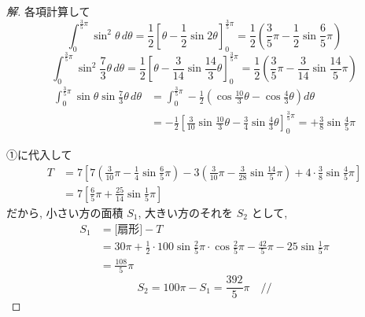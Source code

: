 \documentclass[../main.tex]{subfiles}
\begin{document}
\begin{proof}[解]
  各項計算して
  \[
    \int_0^{\frac{3}{5}\pi} \sin^2\theta \, d\theta = \frac{1}{2} \left[ \theta - \frac{1}{2}\sin 2\theta \right]_0^{\frac{3}{5}\pi} = \frac{1}{2} \left( \frac{3}{5}\pi - \frac{1}{2}\sin\frac{6}{5}\pi \right)
  \]
  \[
    \int_0^{\frac{3}{5}\pi} \sin^2\frac{7}{3}\theta \, d\theta = \frac{1}{2} \left[ \theta - \frac{3}{14}\sin\frac{14}{3}\theta \right]_0^{\frac{3}{5}\pi} = \frac{1}{2} \left( \frac{3}{5}\pi - \frac{3}{14}\sin\frac{14}{5}\pi \right)
  \]
  \begin{align*}
    \int_0^{\frac{3}{5}\pi} \sin\theta\sin\frac{7}{3}\theta \, d\theta &= \int_0^{\frac{3}{5}\pi} -\frac{1}{2} \left( \cos\frac{10}{3}\theta - \cos\frac{4}{3}\theta \right) d\theta \\
    &= -\frac{1}{2} \left[ \frac{3}{10}\sin\frac{10}{3}\theta - \frac{3}{4}\sin\frac{4}{3}\theta \right]_0^{\frac{3}{5}\pi} = +\frac{3}{8}\sin\frac{4}{5}\pi
  \end{align*}

  ①に代入して
  \begin{align*}
    T &= 7 \left[ 7 \left( \frac{3}{10}\pi - \frac{1}{4}\sin\frac{6}{5}\pi \right) - 3 \left( \frac{3}{10}\pi - \frac{3}{28}\sin\frac{14}{5}\pi \right) + 4 \cdot \frac{3}{8}\sin\frac{4}{5}\pi \right] \\
    &= 7 \left[ \frac{6}{5}\pi + \frac{25}{14}\sin\frac{1}{5}\pi \right]
  \end{align*}
  だから, 小さい方の面積 $S_1$, 大きい方のそれを $S_2$ として,
  \begin{align*}
    S_1 &= \text{[扇形]} - T \\
    &= 30\pi + \frac{1}{2} \cdot 100 \sin\frac{2}{5}\pi \cdot \cos\frac{2}{5}\pi - \frac{42}{5}\pi - 25\sin\frac{1}{5}\pi \\
    &= \frac{108}{5}\pi
  \end{align*}
  \[
    S_2 = 100\pi - S_1 = \frac{392}{5}\pi \quad \text{//}
  \]
\end{proof}

\begin{center}
\end{center}
\end{document}
